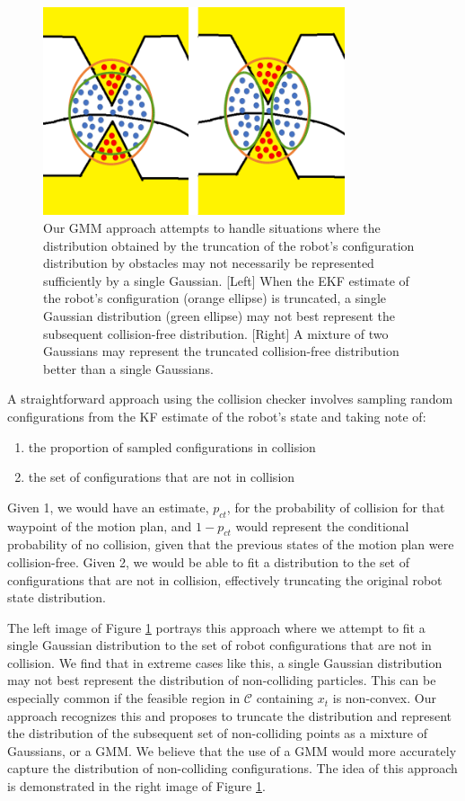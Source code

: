 \documentclass[journal]{IEEEtran}
\begin{document}
\begin{figure}[!t]
\centering
\includegraphics[width=3.5in]{combined_pic.png}
\caption{Our GMM approach attempts to handle situations where the distribution obtained by the truncation of the robot's configuration distribution by obstacles may not necessarily be represented sufficiently by a single Gaussian. [Left] When the EKF estimate of the robot's configuration (orange ellipse) is truncated, a single Gaussian distribution (green ellipse) may not best represent the subsequent collision-free distribution. [Right] A mixture of two Gaussians may represent the truncated collision-free distribution better than a single Gaussians.}
\label{ajaay_justification}
\end{figure}

A straightforward approach using the collision checker involves sampling random configurations from the KF estimate of the robot's state and taking note of:
\begin{enumerate}
\item the proportion of sampled configurations in collision
\item the set of configurations that are not in collision
\end{enumerate}

Given 1, we would have an estimate, $p_{ct}$, for the probability of collision for that waypoint of the motion plan, and $1 - p_{ct}$ would represent the conditional probability of no collision, given that the previous states of the motion plan were collision-free. Given 2, we would be able to fit a distribution to the set of configurations that are not in collision, effectively truncating the original robot state distribution.

The left image of Figure \ref{ajaay_justification} portrays this approach where we attempt to fit a single Gaussian distribution to the set of robot configurations that are not in collision. We find that in extreme cases like this, a single Gaussian distribution may not best represent the distribution of non-colliding particles. This can be especially common if the feasible region in $\mathcal{C}$ containing $x_t$ is non-convex. Our approach recognizes this and proposes to truncate the distribution and represent the distribution of the subsequent set of non-colliding points as a mixture of Gaussians, or a GMM. We believe that the use of a GMM would more accurately capture the distribution of non-colliding configurations. The idea of this approach is demonstrated in the right image of Figure \ref{ajaay_justification}.
\end{document}
